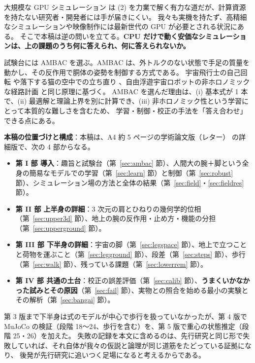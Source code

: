 \documentclass[paper=a4paper,fontsize=10pt,twocolumn,column_gap=2zw,line_length=24zw,number_of_lines=46,head_space=20mm]{jlreq}
\begin{document}
大規模な GPU シミュレーション \cite{makoviychuk2021} は (2) を力業で解く有力な道だが、計算資源を持たない研究者・開発者には手が届きにくい。
我々も実機を持たず、高精細なシミュレーションや映像制作には最新世代の GPU が必要とされる状況にある。
そこで本稿は逆の問いを立てる。\textbf{CPU だけで動く安価なシミュレーションは、上の課題のうち何に答えられ、何に答えられないか。}

試験台には AMBAC を選ぶ。AMBAC は、外トルクのない状態で手足の質量を動かし、その反作用で胴体の姿勢を制御する方式である。
宇宙飛行士の自己回転 \cite{kane1970} や落下する猫の空中での立ち直り \cite{kane1969,montgomery1993}、自由浮遊宇宙ロボットの非ホロノミックな経路計画 \cite{nakamura1991} と同じ原理に基づく。
AMBAC を選んだ理由は、(i) 基本式が 1 本で、(ii) 最適解と理論上界を別に計算でき、(iii) 非ホロノミック性という学習にとって本質的な難しさを含むため、
学習・制御・校正の手法を「答え合わせ」できる点にある。

\textbf{本稿の位置づけと構成}：本稿は、A4 約 5 ページの学術論文版（レター）\cite{letter2026} の詳細版で、次の 4 部からなる。
\begin{itemize}\setlength{\itemsep}{0pt}
\item \textbf{第 I 部 導入}：趣旨と試験台（第~\ref{sec:ambac} 節）、人間大の腕＋脚という全身の簡易なモデルでの学習（第~\ref{sec:learn} 節）と制御（第~\ref{sec:robust} 節）、シミュレーション場の方法と全体の結果（第~\ref{sec:field}・\ref{sec:fieldres} 節）。
\item \textbf{第 II 部 上半身の詳細}：3 次元の肩とひねりの幾何学的位相（第~\ref{sec:upper3d} 節）、地上の腕の反作用・止め方・機能の分担（第~\ref{sec:upperground} 節）。
\item \textbf{第 III 部 下半身の詳細}：宇宙の脚（第~\ref{sec:legspace} 節）、地上で立つことと荷物を運ぶこと（第~\ref{sec:legground} 節）、段差（第~\ref{sec:steps} 節）、歩行（第~\ref{sec:walk} 節）、残っている課題（第~\ref{sec:lowerrem} 節）。
\item \textbf{第 IV 部 共通の土台}：校正の誤差評価（第~\ref{sec:calib} 節）、\textbf{うまくいかなかった試みとその原因}（第~\ref{sec:fail} 節）、実物との照合を始める最小の実験とその解析（第~\ref{sec:bangai} 節）。
\end{itemize}
第 3 版まで下半身は式のモデルが中心で歩行を扱っていなかったが、第 4 版で MuJoCo の検証（段階 18〜24、歩行を含む）を、第 5 版で重心の状態推定（段階 25・26）を加えた。
失敗の記録を本文に含めるのは、先行研究と同じ形で失敗していれば、それ自体が我々の仮説と論理が同じ道筋をたどっている証拠になり、
後発が先行研究に追いつく足場になると考えるからである。
\end{document}
